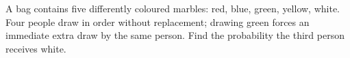 A bag contains five differently coloured marbles: red, blue, green, yellow, white. Four people draw in order without replacement; drawing green forces an immediate extra draw by the same person. Find the probability the third person receives white.
